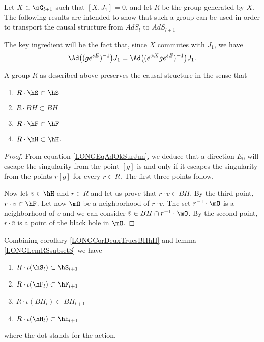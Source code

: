 Let $X\in\sG_{l+1}$ such that $[X,J_1]=0$, and let $R$ be the group generated by $X$. The following results are intended to show that such a group can be used in order to transport the causal structure from $AdS_l$ to $AdS_{l+1}$

The key ingredient will be the fact that, since $X$ commutes with $J_1$, we have
\begin{equation}        \label{LONGEqAdOkSurJun}
    \Ad\big( (g e^{sE})^{-1} \big)J_1=\Ad\big( ( e^{\alpha X}g e^{sE})^{-1} \big)J_1.
\end{equation}

\begin{lemma}        \label{LONGLemRSsubsetS}
    A group $R$ as described above preserves the causal structure in the sense that
    \begin{multicols}{2}
    \begin{enumerate}

        \item
            $R\cdot\hS\subset\hS$
        \item
            $R\cdot BH\subset BH$
        \item
            $R\cdot \hF\subset\hF$
        \item
            $R\cdot \hH\subset\hH$.

    \end{enumerate}
    \end{multicols}
\end{lemma}

\begin{proof}
    From equation \eqref{LONGEqAdOkSurJun}, we deduce that a direction $E_0$ will escape the singularity from the point $[g]$ is and only if it escapes the singularity from the points $r[g]$ for every $r\in R$. The first three points follow.

    Now let $v\in\hH$ and $r\in R$ and let us prove that $r\cdot v\in BH$. By the third point, $r\cdot v\in\hF$. Let now $\mO$ be a neighborhood of $r\cdot v$. The set $r^{-1}\cdot \mO$ is a neighborhood of $v$ and we can consider $\bar v\in BH\cap r^{-1}\cdot\mO$. By the second point, $r\cdot \bar v$ is a point of the black hole in $\mO$.
\end{proof}

\begin{remark}        \label{LONGRemdqnqRSlsubsetSlpu}
    Combining corollary \ref{LONGCorDeuxTrucsBHhH} and lemma \ref{LONGLemRSsubsetS} we have
    \begin{multicols}{2}
    \begin{enumerate}
        \item
            $ R\cdot\iota(\hS_l)\subset\hS_{l+1}$
        \item
            $ R\cdot\iota(\hF_l)\subset\hF_{l+1}$
        \item
            $ R\cdot\iota(BH_{l})\subset BH_{l+1}$
        \item
            $ R\cdot\iota(\hH_{l})\subset\hH_{l+1}$
    \end{enumerate}
    \end{multicols}
    where the dot stands for the action.
\end{remark}


